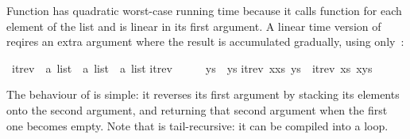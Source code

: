 \begin{isabellebody}
\begin{isamarkuptext}
Function  has quadratic worst-case running time
because it calls function \isa{{\isacharat}} for each element of the list and
\isa{{\isacharat}} is linear in its first argument.  A linear time version of
 reqires an extra argument where the result is accumulated
gradually, using only~\isa{{\isacharhash}}:%
\end{isamarkuptext}%
\isamarkuptrue%
\ itrev\ {\isacharcolon}{\isacharcolon}\ {\isachardoublequote}{\isacharprime}a\ list\ {\isasymRightarrow}\ {\isacharprime}a\ list\ {\isasymRightarrow}\ {\isacharprime}a\ list{\isachardoublequote}\isanewline
\isamarkupfalse%
\isanewline
{\isachardoublequote}itrev\ {\isacharbrackleft}{\isacharbrackright}\ \ \ \ \ ys\ {\isacharequal}\ ys{\isachardoublequote}\isanewline
{\isachardoublequote}itrev\ {\isacharparenleft}x{\isacharhash}xs{\isacharparenright}\ ys\ {\isacharequal}\ itrev\ xs\ {\isacharparenleft}x{\isacharhash}ys{\isacharparenright}{\isachardoublequote}\isamarkupfalse%
%
\begin{isamarkuptext}%
\noindent
The behaviour of  is simple: it reverses
its first argument by stacking its elements onto the second argument,
and returning that second argument when the first one becomes
empty. Note that  is tail-recursive: it can be
compiled into a loop.


\end{isamarkuptext}
\end{isabellebody}
